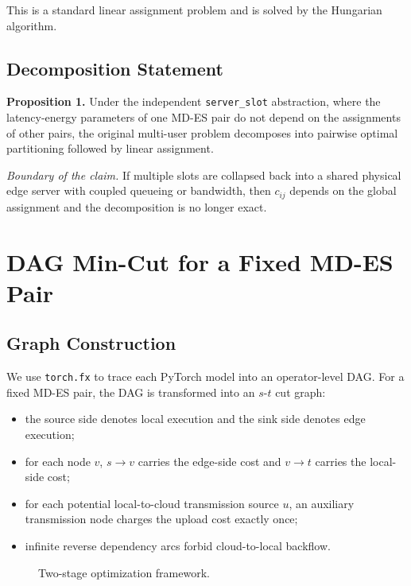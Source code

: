 \documentclass[conference]{IEEEtran}
\begin{document}
This is a standard linear assignment problem and is solved by the Hungarian
algorithm.

\subsection{Decomposition Statement}

\textbf{Proposition 1.} Under the independent \texttt{server\_slot}
abstraction, where the latency-energy parameters of one MD-ES pair do not
depend on the assignments of other pairs, the original multi-user problem
decomposes into pairwise optimal partitioning followed by linear assignment.

\textit{Boundary of the claim.} If multiple slots are collapsed back into a
shared physical edge server with coupled queueing or bandwidth, then $c_{ij}$
depends on the global assignment and the decomposition is no longer exact.

\section{DAG Min-Cut for a Fixed MD-ES Pair}

\subsection{Graph Construction}

We use \texttt{torch.fx} to trace each PyTorch model into an operator-level
DAG. For a fixed MD-ES pair, the DAG is transformed into an $s$-$t$ cut graph:
\begin{itemize}
\item the source side denotes local execution and the sink side denotes edge
execution;
\item for each node $v$, $s \rightarrow v$ carries the edge-side cost and
$v \rightarrow t$ carries the local-side cost;
\item for each potential local-to-cloud transmission source $u$, an auxiliary
transmission node charges the upload cost exactly once;
\item infinite reverse dependency arcs forbid cloud-to-local backflow.
\end{itemize}

\begin{figure}[t]
\centering
{}
\caption{Two-stage optimization framework.}
\label{fig:framework}
\end{figure}
\end{document}
